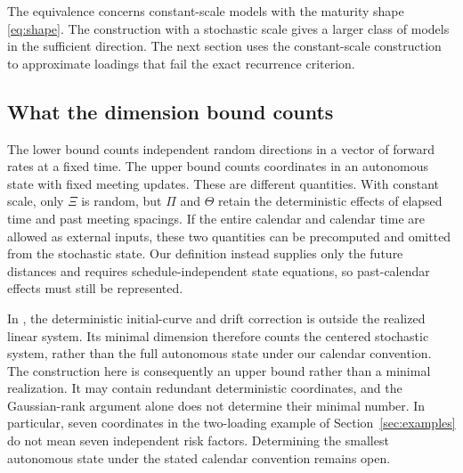 The equivalence concerns constant-scale models with the maturity shape \eqref{eq:shape}. The construction with a stochastic scale gives a larger class of models in the sufficient direction. The next section uses the constant-scale construction to approximate loadings that fail the exact recurrence criterion.

\subsection{What the dimension bound counts}
The lower bound counts independent random directions in a vector of forward rates at a fixed time. The upper bound counts coordinates in an autonomous state with fixed meeting updates. These are different quantities. With constant scale, only $\Xi$ is random, but $\Pi$ and $\Theta$ retain the deterministic effects of elapsed time and past meeting spacings. If the entire calendar and calendar time are allowed as external inputs, these two quantities can be precomputed and omitted from the stochastic state. Our definition instead supplies only the future distances and requires schedule-independent state equations, so past-calendar effects must still be represented.

In \citet[Definition 2.1 and Proposition 4.1]{bjork1999minimal}, the deterministic initial-curve and drift correction is outside the realized linear system. Its minimal dimension therefore counts the centered stochastic system, rather than the full autonomous state under our calendar convention. The construction here is consequently an upper bound rather than a minimal realization. It may contain redundant deterministic coordinates, and the Gaussian-rank argument alone does not determine their minimal number. In particular, seven coordinates in the two-loading example of Section~\ref{sec:examples} do not mean seven independent risk factors. Determining the smallest autonomous state under the stated calendar convention remains open.
